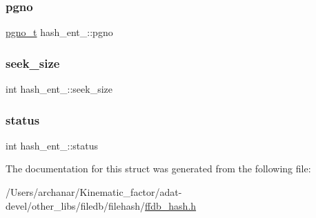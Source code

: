\subsubsection{\texorpdfstring{pgno}{pgno}}
{\footnotesize\ttfamily \mbox{\hyperlink{adat-devel_2other__libs_2filedb_2filehash_2ffdb__db_8h_a000813331643d38481142bcce7de1501}{pgno\+\_\+t}} hash\+\_\+ent\+\_\+\+::pgno}

\mbox{\label{structhash__ent___a8fb6b4a631c3d7a65533740791b34432}} 
\subsubsection{\texorpdfstring{seek\_size}{seek\_size}}
{\footnotesize\ttfamily int hash\+\_\+ent\+\_\+\+::seek\+\_\+size}

\mbox{\label{structhash__ent___a5ee6daeaf6c53eace7610ddcad3da4d0}} 
\subsubsection{\texorpdfstring{status}{status}}
{\footnotesize\ttfamily int hash\+\_\+ent\+\_\+\+::status}



The documentation for this struct was generated from the following file\+:\begin{DoxyCompactItemize}
\item 
/\+Users/archanar/\+Kinematic\+\_\+factor/adat-\/devel/other\+\_\+libs/filedb/filehash/\mbox{\hyperlink{adat-devel_2other__libs_2filedb_2filehash_2ffdb__hash_8h}{ffdb\+\_\+hash.\+h}}\end{DoxyCompactItemize}
